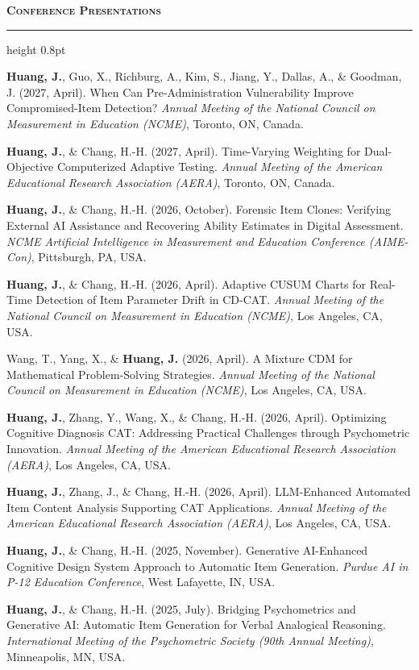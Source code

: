 \documentclass[10.5pt,letterpaper]{article}
\renewcommand{\section}[1]{%
  \needspace{3\baselineskip}\vspace{12pt}\par
  {\fontsize{13.5}{16}\selectfont\bfseries\scshape\color{accent}#1}\hspace{6pt}%
  {\color{accent}\leaders\hrule height 0.8pt\hfill\kern0pt}\par\vspace{6pt}}
\newcommand{\me}[1]{\textbf{#1}}   %
\begin{document}
\section{Conference Presentations}
\begin{pubs}
\item \me{Huang, J.}, Guo, X., Richburg, A., Kim, S., Jiang, Y., Dallas, A., \& Goodman, J. (2027, April). When Can Pre-Administration Vulnerability Improve Compromised-Item Detection? \textit{Annual Meeting of the National Council on Measurement in Education (NCME)}, Toronto, ON, Canada.
\item \me{Huang, J.}, \& Chang, H.-H. (2027, April). Time-Varying Weighting for Dual-Objective Computerized Adaptive Testing. \textit{Annual Meeting of the American Educational Research Association (AERA)}, Toronto, ON, Canada.
\item \me{Huang, J.}, \& Chang, H.-H. (2026, October). Forensic Item Clones: Verifying External AI Assistance and Recovering Ability Estimates in Digital Assessment. \textit{NCME Artificial Intelligence in Measurement and Education Conference (AIME-Con)}, Pittsburgh, PA, USA.
\item \me{Huang, J.}, \& Chang, H.-H. (2026, April). Adaptive CUSUM Charts for Real-Time Detection of Item Parameter Drift in CD-CAT. \textit{Annual Meeting of the National Council on Measurement in Education (NCME)}, Los Angeles, CA, USA.
\item Wang, T., Yang, X., \& \me{Huang, J.} (2026, April). A Mixture CDM for Mathematical Problem-Solving Strategies. \textit{Annual Meeting of the National Council on Measurement in Education (NCME)}, Los Angeles, CA, USA.
\item \me{Huang, J.}, Zhang, Y., Wang, X., \& Chang, H.-H. (2026, April). Optimizing Cognitive Diagnosis CAT: Addressing Practical Challenges through Psychometric Innovation. \textit{Annual Meeting of the American Educational Research Association (AERA)}, Los Angeles, CA, USA.
\item \me{Huang, J.}, Zhang, J., \& Chang, H.-H. (2026, April). LLM-Enhanced Automated Item Content Analysis Supporting CAT Applications. \textit{Annual Meeting of the American Educational Research Association (AERA)}, Los Angeles, CA, USA.
\item \me{Huang, J.}, \& Chang, H.-H. (2025, November). Generative AI-Enhanced Cognitive Design System Approach to Automatic Item Generation. \textit{Purdue AI in P-12 Education Conference}, West Lafayette, IN, USA.
\item \me{Huang, J.}, \& Chang, H.-H. (2025, July). Bridging Psychometrics and Generative AI: Automatic Item Generation for Verbal Analogical Reasoning. \textit{International Meeting of the Psychometric Society (90th Annual Meeting)}, Minneapolis, MN, USA.

\end{pubs}
\end{document}

